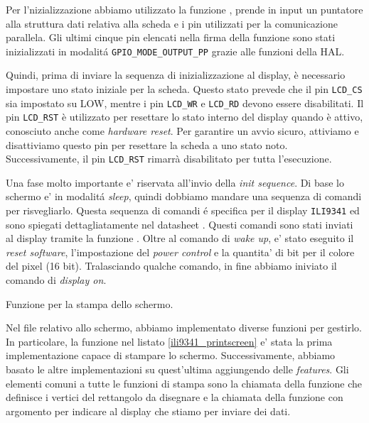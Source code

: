 \documentclass[a4paper]{article}
\begin{document}
Per l'nizializzazione abbiamo utilizzato la funzione {}, prende in input un puntatore alla struttura dati relativa alla scheda e i pin utilizzati per la comunicazione parallela. Gli ultimi cinque pin elencati nella firma della funzione sono stati inizializzati in modalitá \texttt{GPIO\_MODE\_OUTPUT\_PP} grazie alle funzioni della HAL.

Quindi, prima di inviare la sequenza di inizializzazione al display, è necessario impostare uno stato iniziale per la scheda. Questo stato prevede che il pin \texttt{LCD\_CS} sia impostato su LOW, mentre i pin \texttt{LCD\_WR} e \texttt{LCD\_RD} devono essere disabilitati. Il pin \texttt{LCD\_RST} è utilizzato per resettare lo stato interno del display quando è attivo, conosciuto anche come \textit{hardware reset}. Per garantire un avvio sicuro, attiviamo e disattiviamo questo pin per resettare la scheda a uno stato noto. Successivamente, il pin \texttt{LCD\_RST} rimarrà disabilitato per tutta l'esecuzione.

Una fase molto importante e' riservata all'invio della \textit{init sequence}.
Di base lo schermo e' in modalitá \textit{sleep}, quindi dobbiamo mandare una sequenza di comandi per risvegliarlo. Questa sequenza di comandi é specifica per il display \texttt{ILI9341} ed sono spiegati dettagliatamente nel datasheet \cite{ili9341}. Questi comandi sono stati inviati al display tramite la funzione {}. Oltre al comando di \textit{wake up}, e' stato eseguito il \textit{reset software}, l'impostazione del \textit{power control} e la quantita' di bit per il colore del pixel (16 bit). Tralasciando qualche comando, in fine abbiamo iniviato il comando di \textit{display on}.

\begin{Listing}[h!t] %
    \centering
    \caption{Funzione per la stampa dello schermo.}
    \label{ili9341_printscreen}
\end{Listing}

Nel file relativo allo schermo, abbiamo implementato diverse funzioni per gestirlo. In particolare, la funzione nel listato \ref{ili9341_printscreen} e' stata la prima implementazione capace di stampare lo schermo. Successivamente, abbiamo basato le altre implementazioni su quest'ultima aggiungendo delle \textit{features}.
Gli elementi comuni a tutte le funzioni di stampa sono la chiamata della funzione {} che definisce i vertici del rettangolo da disegnare e la chiamata della funzione  con argomento {} per indicare al display che stiamo per inviare dei dati.
\end{document}
